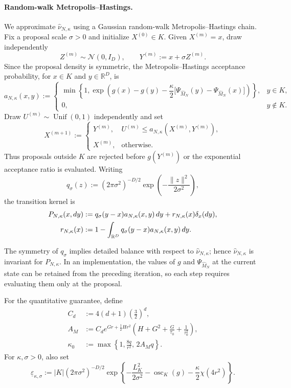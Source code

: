 \documentclass{article}
\newcommand{\R}{\mathbb R}
\newcommand{\osc}{\operatorname{osc}}
\newcommand{\wideM}{\widehat M_N}
\newcommand{\whatnu}{\widehat\nu_{N,\kappa}}
\numberwithin{equation}{section}
\begin{document}
\paragraph{Random-walk Metropolis--Hastings.}
We approximate $\whatnu$ using a Gaussian random-walk
Metropolis--Hastings chain. Fix a proposal scale $\sigma>0$ and initialize
$X^{(0)}\in K$. Given $X^{(m)}=x$, draw independently
\[
 Z^{(m)}\sim\mathcal N(0,I_D),
 \qquad
 Y^{(m)}:=x+\sigma Z^{(m)}.
\]
Since the proposal density is symmetric, the Metropolis--Hastings
acceptance probability, for $x\in K$ and $y\in\R^D$, is
\begin{equation}
 a_{N,\kappa}(x,y)
 :=
 \begin{cases}
 \displaystyle
 \min\left\{
  1,
  \exp\left(
    g(x)-g(y)
    -\dfrac\kappa2
     \bigl[\Psi_{\wideM}(y)-\Psi_{\wideM}(x)\bigr]
  \right)
 \right\}, & y\in K,\\[2ex]
 0, & y\notin K.
 \end{cases}
\label{eq:rwmh-acceptance}
\end{equation}
Draw $U^{(m)}\sim\operatorname{Unif}(0,1)$ independently and set
\begin{equation}
 X^{(m+1)}
 :=
 \begin{cases}
  Y^{(m)}, & U^{(m)}\le a_{N,\kappa}(X^{(m)},Y^{(m)}),\\
  X^{(m)}, & \text{otherwise}.
 \end{cases}
\label{eq:rwmh-update}
\end{equation}
Thus proposals outside $K$ are rejected before $g(Y^{(m)})$ or the
exponential acceptance ratio is evaluated. Writing
\[
 q_\sigma(z)
 :=(2\pi\sigma^2)^{-D/2}
   \exp\left(-\frac{\lVert z\rVert^2}{2\sigma^2}\right),
\]
the transition kernel is
\begin{align}
 P_{N,\kappa}(x,dy)
 :={}&q_\sigma(y-x)a_{N,\kappa}(x,y)\,dy
 +r_{N,\kappa}(x)\delta_x(dy),
\label{eq:rwmh-kernel}\\
 r_{N,\kappa}(x)
 :={}&1-
 \int_{\R^D}q_\sigma(y-x)a_{N,\kappa}(x,y)\,dy.
\notag
\end{align}


The symmetry of $q_\sigma$ implies detailed balance with respect to $\whatnu$; hence $\whatnu$ is invariant for $P_{N,\kappa}$. In an implementation, the values of $g$ and $\Psi_{\wideM}$ at the current state can be retained from the preceding iteration, so each step requires evaluating them only at the proposal.

For the quantitative guarantee, define
\begin{align}
 C_d
 &:=4(d+1)\left(\frac32\right)^d,\\
 A_M
 &:=C_d e^{Gr+\frac12Hr^2 }
 \left(
 H+G^2+\frac{G}{\tau_0}+\frac1{\tau_0^2}
 \right),
\label{eq:AM-def}\\
 \kappa_0&:=\max\left\{1,\frac{8q}{r^2},\,2A_Mq\right\}.
\end{align}
For $\kappa,\sigma>0$, also set
\begin{equation}
 \underline\varepsilon_{\kappa,\sigma}
 :=|K|(2\pi\sigma^2)^{-D/2}
   \exp\left\{
     -\frac{L_K^2}{2\sigma^2}
     -\osc_K(g)
     -\frac{\kappa}{2}\chi(4r^2)
   \right\}.
\label{eq:rwmh-deterministic-minorization}
\end{equation}
\end{document}
